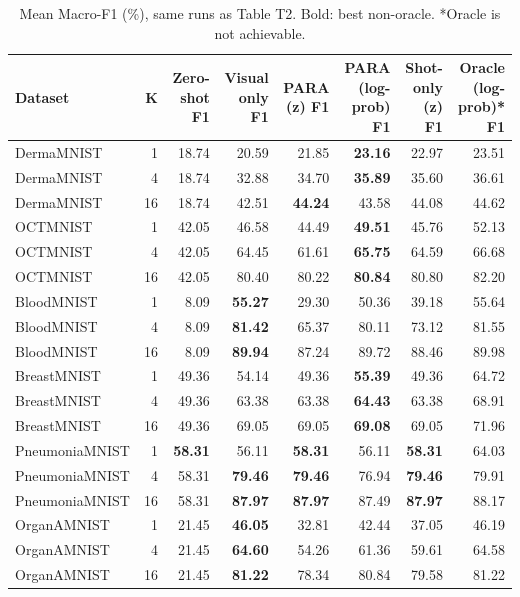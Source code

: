 \begin{table}[t]
\centering
\small
\caption{Mean Macro-F1 (\%), same runs as Table T2. Bold: best non-oracle. *Oracle is not achievable.}
\label{tab:T2b_main_results_macroF1}
\begin{tabular}{lrrrrrrr}
\toprule
Dataset & K & Zero-shot F1 & Visual only F1 & PARA (z) F1 & PARA (log-prob) F1 & Shot-only (z) F1 & Oracle (log-prob)* F1 \\
\midrule
DermaMNIST & 1 & 18.74 & 20.59 & 21.85 & \textbf{23.16} & 22.97 & 23.51 \\
DermaMNIST & 4 & 18.74 & 32.88 & 34.70 & \textbf{35.89} & 35.60 & 36.61 \\
DermaMNIST & 16 & 18.74 & 42.51 & \textbf{44.24} & 43.58 & 44.08 & 44.62 \\
OCTMNIST & 1 & 42.05 & 46.58 & 44.49 & \textbf{49.51} & 45.76 & 52.13 \\
OCTMNIST & 4 & 42.05 & 64.45 & 61.61 & \textbf{65.75} & 64.59 & 66.68 \\
OCTMNIST & 16 & 42.05 & 80.40 & 80.22 & \textbf{80.84} & 80.80 & 82.20 \\
BloodMNIST & 1 & 8.09 & \textbf{55.27} & 29.30 & 50.36 & 39.18 & 55.64 \\
BloodMNIST & 4 & 8.09 & \textbf{81.42} & 65.37 & 80.11 & 73.12 & 81.55 \\
BloodMNIST & 16 & 8.09 & \textbf{89.94} & 87.24 & 89.72 & 88.46 & 89.98 \\
BreastMNIST & 1 & 49.36 & 54.14 & 49.36 & \textbf{55.39} & 49.36 & 64.72 \\
BreastMNIST & 4 & 49.36 & 63.38 & 63.38 & \textbf{64.43} & 63.38 & 68.91 \\
BreastMNIST & 16 & 49.36 & 69.05 & 69.05 & \textbf{69.08} & 69.05 & 71.96 \\
PneumoniaMNIST & 1 & \textbf{58.31} & 56.11 & \textbf{58.31} & 56.11 & \textbf{58.31} & 64.03 \\
PneumoniaMNIST & 4 & 58.31 & \textbf{79.46} & \textbf{79.46} & 76.94 & \textbf{79.46} & 79.91 \\
PneumoniaMNIST & 16 & 58.31 & \textbf{87.97} & \textbf{87.97} & 87.49 & \textbf{87.97} & 88.17 \\
OrganAMNIST & 1 & 21.45 & \textbf{46.05} & 32.81 & 42.44 & 37.05 & 46.19 \\
OrganAMNIST & 4 & 21.45 & \textbf{64.60} & 54.26 & 61.36 & 59.61 & 64.58 \\
OrganAMNIST & 16 & 21.45 & \textbf{81.22} & 78.34 & 80.84 & 79.58 & 81.22 \\
\bottomrule
\end{tabular}
\end{table}
